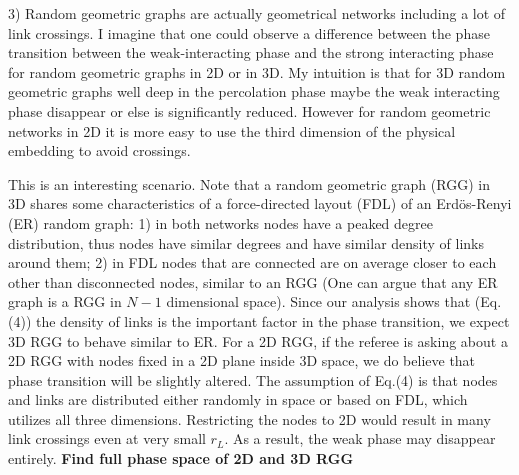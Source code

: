 \documentclass[11pt]{article}
\begin{document}
\begin{response}

\end{response}
\begin{response}{
3) Random geometric graphs are actually geometrical networks including a lot of link crossings. I imagine that one could observe a difference between the phase transition between the weak-interacting phase and the strong interacting phase for random geometric graphs in 2D or in 3D. My intuition is that for 3D random geometric graphs well deep in the percolation phase maybe the weak interacting phase disappear or else is significantly reduced. However for random geometric networks in 2D it is more easy to use the third dimension of the physical embedding to avoid crossings. 
}

This is an interesting scenario. 
Note that a random geometric graph (RGG) in 3D shares some characteristics of a force-directed layout (FDL) of an Erd\"os-Renyi (ER) random graph: 
1) in both networks nodes have a peaked degree distribution, thus nodes have similar degrees and have similar density of links around them; 2) in FDL nodes that are connected are on average closer to each other than disconnected nodes, similar to an RGG (One can argue that any ER graph is a RGG in $N-1$ dimensional space). 
Since our analysis shows that (Eq.(4)) the density of links is the important factor in the phase transition, we expect 3D RGG to behave similar to ER. 
For a 2D RGG, if the referee is asking about a 2D RGG with nodes fixed in a 2D plane inside 3D space, we do believe that phase transition will be slightly altered. 
The assumption of Eq.(4) is that nodes and links are distributed either randomly in space or based on FDL, which utilizes all three dimensions. 
Restricting the nodes to 2D would result in many link crossings even at very small $r_L$. 
As a result, the weak phase may disappear entirely. 
{\color{red}\bf  Find full phase space of 2D and 3D RGG}


\end{response}
\end{document}
